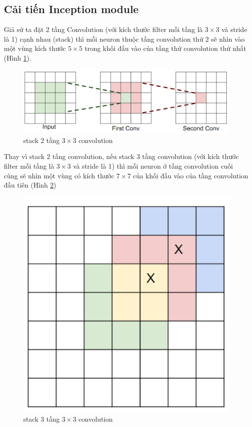 \documentclass[a4paper,12pt]{report}
\begin{document}
\subsection{Cải tiến Inception module}
\par Giả sử ta đặt 2 tầng Convolution (với kích thước filter mỗi tầng là $3 \times 3$ và stride là 1) cạnh nhau (stack) thì mỗi neuron thuộc tầng convolution thứ 2 sẽ nhìn vào một vùng kích thước $5 \times 5$ trong khối đầu vào của tầng thứ convolution thứ nhất (Hình \ref{fig_2conv3x3}). 
\begin{figure}[H]
\includegraphics[scale=0.5]{2conv3x3.png}
\caption{stack 2 tầng $3 \times 3$ convolution}
\label{fig_2conv3x3}
\end{figure}
\par Thay vì stack 2 tầng convolution, nếu stack 3 tầng convolution (với kích thước filter mỗi tầng là $3 \times 3$ và stride là 1) thì mỗi neuron ở tầng convolution cuối cùng sẽ nhìn một vùng có kích thước $7 \times 7$ của khối đầu vào của tầng convolution đầu tiên (Hình \ref{fig_3conv3x3})
\begin{figure}[H]
\centering
\includegraphics[scale=0.4]{3conv3x3.png}
\caption{stack 3 tầng $3 \times 3$ convolution}
\label{fig_3conv3x3}
\end{figure}
\end{document}
